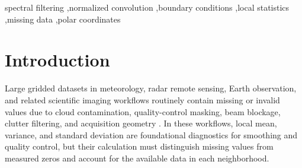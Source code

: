 \documentclass[a4paper,fleqn]{cas-sc}
\begin{document}


\begin{keywords}
spectral filtering \sep normalized convolution \sep boundary conditions \sep local statistics \sep missing data \sep polar coordinates
\end{keywords}

\maketitle

\doublespacing

\section{Introduction}
\label{sec:introduction}

Large gridded datasets in meteorology, radar remote sensing, Earth observation, and related scientific imaging workflows
routinely contain missing or invalid values due to cloud contamination, quality-control masking, beam blockage, clutter
filtering, and acquisition geometry  \citep{JuRoy2008,Shen2015,Hubbert2009Part1}.
In these workflows, local mean, variance, and standard deviation are foundational
diagnostics for smoothing and quality control, but their calculation must distinguish missing values from measured zeros and account for the available data in each neighborhood.
\end{document}
